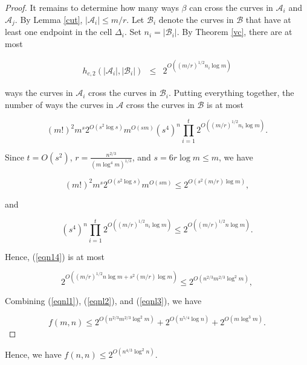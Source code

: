 \documentclass[11pt]{article}
\theoremstyle{plain}
\theoremstyle{definition}
\theoremstyle{remark}
\begin{document}
\begin{proof}
It remains to determine how many ways $\beta$ can cross the curves in $\mathcal{A}_i$ and $\mathcal{A}_j$.  By Lemma \ref{cut}, $|\mathcal{A}_i| \leq m/r$.   Let $\mathcal{B}_i$ denote the curves in $\mathcal{B}$ that have at least one endpoint in the cell $\Delta_i$.  Set $n_i  = |\mathcal{B}_i|$.  By Theorem \ref{vc}, there are at most 



$$\begin{array}{ccl}
   h_{c,2}(|\mathcal{A}_i|,|\mathcal{B}_i|)  & \leq &  2^{O((m/r)^{1/2}n_i\log m)}
\end{array}$$
 
 
 \noindent ways the curves in $\mathcal{A}_i$ cross the curves in $\mathcal{B}_i$.  Putting everything together, the number of ways the curves in $\mathcal{A}$ cross the curves in $\mathcal{B}$ is at most

\begin{equation}\label{eqn14} (m!)^2m^s2^{O(s^2\log s)}m^{O(sm)}\left(s^4\right)^n\prod\limits_{i = 1}^t2^{O((m/r)^{1/2}n_i\log m)} .\end{equation}


 

\noindent Since $t = O(s^2)$, $r = \frac{n^{2/3}}{(m\log^{4} m)^{1/3}}$, and $s = 6r\log m \leq m$, we have


$$(m!)^2m^s2^{O(s^2\log s)}m^{O(sm)} \leq 2^{O(s^2(m/r)\log m)},$$

\noindent and

$$\left(s^4\right)^n\prod\limits_{i = 1}^t2^{O((m/r)^{1/2}n_i\log m)} \leq 2^{O( (m/r)^{1/2}n\log m)}.$$


\noindent Hence, (\ref{eqn14}) is at most


\begin{equation}\label{eqnl3}
    2^{O( (m/r)^{1/2}n\log m + s^2(m/r)\log m)}\leq 2^{O(n^{2/3}m^{2/3}\log^2 m)},
\end{equation}

\noindent  Combining (\ref{eqnl1}), (\ref{eqnl2}), and (\ref{eqnl3}), we have


  $$f(m,n) \leq  2^{O(n^{2/3}m^{2/3}\log^2 m)} + 2^{O(n^{5/4}\log n)} + 2^{O(m\log^3m)}.$$\end{proof}


 \noindent Hence, we have $f(n,n) \leq 2^{O\left(n^{4/3}\log^2 n\right)}.$
 
\end{document}
